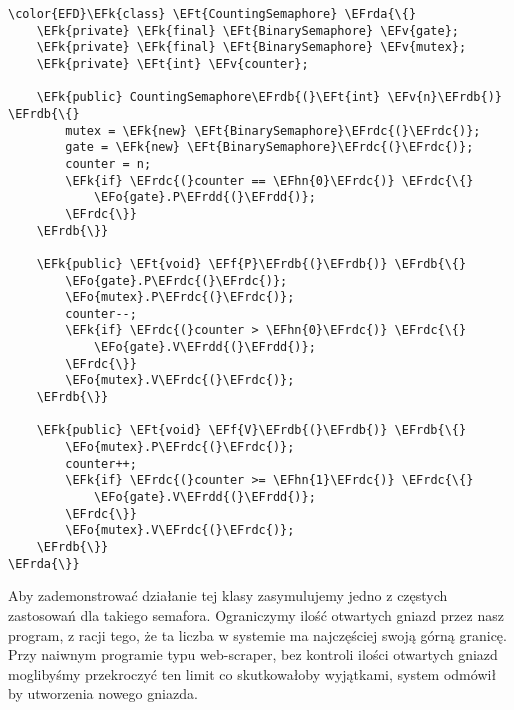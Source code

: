 \documentclass[11pt]{article}
\newcommand{\EFk}[1]{\textcolor{EFk}{#1}} %
\newcommand{\EFf}[1]{\textcolor{EFf}{#1}} %
\newcommand{\EFv}[1]{\textcolor{EFv}{#1}} %
\newcommand{\EFt}[1]{\textcolor{EFt}{#1}} %
\newcommand{\EFo}[1]{\textcolor{EFo}{#1}} %
\newcommand{\EFhn}[1]{\textcolor{EFhn}{#1}} %
\newcommand{\EFrda}[1]{#1} %
\newcommand{\EFrdb}[1]{\textcolor{EFrdb}{#1}} %
\newcommand{\EFrdc}[1]{\textcolor{EFrdc}{#1}} %
\newcommand{\EFrdd}[1]{\textcolor{EFrdd}{#1}} %
\begin{document}
\begin{Code}
\begin{Verbatim}
\color{EFD}\EFk{class} \EFt{CountingSemaphore} \EFrda{\{}
    \EFk{private} \EFk{final} \EFt{BinarySemaphore} \EFv{gate};
    \EFk{private} \EFk{final} \EFt{BinarySemaphore} \EFv{mutex};
    \EFk{private} \EFt{int} \EFv{counter};

    \EFk{public} CountingSemaphore\EFrdb{(}\EFt{int} \EFv{n}\EFrdb{)} \EFrdb{\{}
        mutex = \EFk{new} \EFt{BinarySemaphore}\EFrdc{(}\EFrdc{)};
        gate = \EFk{new} \EFt{BinarySemaphore}\EFrdc{(}\EFrdc{)};
        counter = n;
        \EFk{if} \EFrdc{(}counter == \EFhn{0}\EFrdc{)} \EFrdc{\{}
            \EFo{gate}.P\EFrdd{(}\EFrdd{)};
        \EFrdc{\}}
    \EFrdb{\}}

    \EFk{public} \EFt{void} \EFf{P}\EFrdb{(}\EFrdb{)} \EFrdb{\{}
        \EFo{gate}.P\EFrdc{(}\EFrdc{)};
        \EFo{mutex}.P\EFrdc{(}\EFrdc{)};
        counter--;
        \EFk{if} \EFrdc{(}counter > \EFhn{0}\EFrdc{)} \EFrdc{\{}
            \EFo{gate}.V\EFrdd{(}\EFrdd{)};
        \EFrdc{\}}
        \EFo{mutex}.V\EFrdc{(}\EFrdc{)};
    \EFrdb{\}}

    \EFk{public} \EFt{void} \EFf{V}\EFrdb{(}\EFrdb{)} \EFrdb{\{}
        \EFo{mutex}.P\EFrdc{(}\EFrdc{)};
        counter++;
        \EFk{if} \EFrdc{(}counter >= \EFhn{1}\EFrdc{)} \EFrdc{\{}
            \EFo{gate}.V\EFrdd{(}\EFrdd{)};
        \EFrdc{\}}
        \EFo{mutex}.V\EFrdc{(}\EFrdc{)};
    \EFrdb{\}}
\EFrda{\}}
\end{Verbatim}
\end{Code}

Aby zademonstrować działanie tej klasy zasymulujemy jedno z częstych zastosowań
dla takiego semafora. Ograniczymy ilość otwartych gniazd przez nasz program, z
racji tego, że ta liczba w systemie ma najczęściej swoją górną granicę.
Przy naiwnym programie typu web-scraper, bez kontroli ilości otwartych gniazd
moglibyśmy przekroczyć ten limit co skutkowałoby wyjątkami, system odmówił by
utworzenia nowego gniazda.
\end{document}
